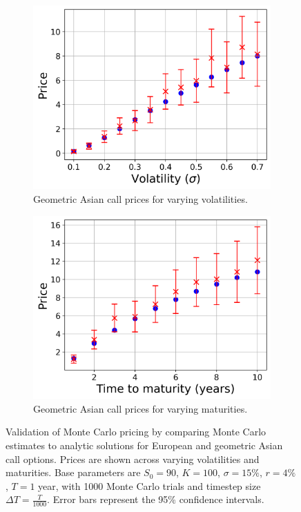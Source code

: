\begin{figure}[H]
    \vspace{0.5cm} %

    \begin{subfigure}[b]{0.45\linewidth}
        \centering
        \includegraphics[width=\linewidth]{graphics/validation_mc_geometric_call_vol.png}
        \caption{Geometric Asian call prices for varying volatilities.}
        \label{fig:geometric_call_vol}
    \end{subfigure}
    \hfill
    \begin{subfigure}[b]{0.45\linewidth}
        \centering
        \includegraphics[width=\linewidth]{graphics/validation_mc_geometric_call_T.png}
        \caption{Geometric Asian call prices for varying maturities.}
        \label{fig:geometric_call_T}
    \end{subfigure}

    \caption{Validation of Monte Carlo pricing by comparing Monte Carlo estimates to analytic 
    solutions for European and geometric Asian call options. Prices are shown across varying 
    volatilities and maturities. Base parameters are $S_0 = 90$, $K=100$, $\sigma = 15\%$, 
    $r=4\%$, $T=1$ year, with 1000 Monte Carlo trials and timestep size 
    $\Delta T = \frac{T}{1000}$. Error bars represent the 95\% confidence intervals.}
    \label{fig:validating_MC_prices}
\end{figure}
